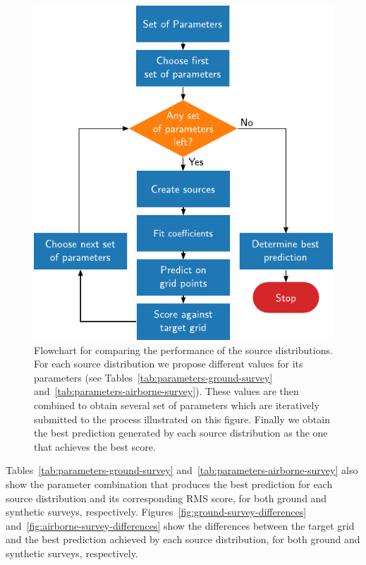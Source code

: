 \documentclass[twocolumn]{article}
\begin{document}
\begin{figure}
    \includegraphics[width=\linewidth]{figs/flowchart.pdf}
    \caption{
        Flowchart for comparing the performance of the source distributions.
        For each source distribution we propose different values for its
        parameters (see Tables~\ref{tab:parameters-ground-survey}
        and~\ref{tab:parameters-airborne-survey}).
        These values are then combined to obtain several set of parameters
        which are iteratively submitted to the process illustrated on this
        figure.
        Finally we obtain the best prediction generated by each source
        distribution as the one that achieves the best score.
    }
    \label{fig:flowchart}
\end{figure}


Tables~\ref{tab:parameters-ground-survey}
and~\ref{tab:parameters-airborne-survey} also show the parameter combination
that produces the best prediction for each source distribution and its
corresponding RMS score, for both ground and synthetic surveys, respectively.
Figures~\ref{fig:ground-survey-differences}
and~\ref{fig:airborne-survey-differences} show the differences between the
target grid and the best prediction achieved by each source distribution, for
both ground and synthetic surveys, respectively.
\end{document}
